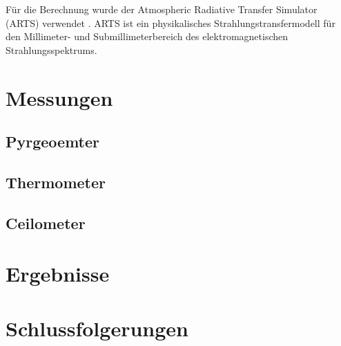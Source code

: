 \documentclass[10pt,a4paper,compsoc,peer review papers]{IEEEtran}
\begin{document}
Für die Berechnung wurde der Atmospheric Radiative Transfer Simulator (ARTS)
verwendet \cite{Eriksson2011}. ARTS ist ein physikalisches
Strahlungstransfermodell für den Millimeter- und Submillimeterbereich des
elektromagnetischen Strahlungsspektrums.


\section{Messungen}\label{sec:messungen}

\subsection{Pyrgeoemter}\label{subsec:pyrgeometer}

\subsection{Thermometer}\label{subsecthermometer}

\subsection{Ceilometer}\label{subsec:ceilomter}


\section{Ergebnisse}\label{sec:ergebnisse}


\section{Schlussfolgerungen}\label{sec:schlussfolgerungen}



\end{document}
